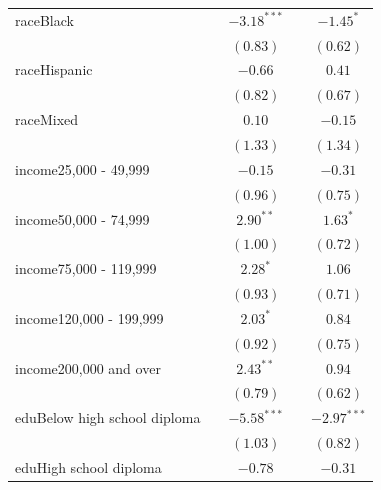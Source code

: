 \documentclass[
  12,
  letterpaper,
  DIV=11,
  numbers=noendperiod]{scrartcl}
\begin{document}
\begin{table}
{\begin{center}
\begin{tabular}{l c c c c}
raceBlack                       &               & $-3.18^{***}$ &              & $-1.45^{*}$   \\
                                &               & $(0.83)$      &              & $(0.62)$      \\
raceHispanic                    &               & $-0.66$       &              & $0.41$        \\
                                &               & $(0.82)$      &              & $(0.67)$      \\
raceMixed                       &               & $0.10$        &              & $-0.15$       \\
                                &               & $(1.33)$      &              & $(1.34)$      \\
income25,000 - 49,999           &               & $-0.15$       &              & $-0.31$       \\
                                &               & $(0.96)$      &              & $(0.75)$      \\
income50,000 - 74,999           &               & $2.90^{**}$   &              & $1.63^{*}$    \\
                                &               & $(1.00)$      &              & $(0.72)$      \\
income75,000 - 119,999          &               & $2.28^{*}$    &              & $1.06$        \\
                                &               & $(0.93)$      &              & $(0.71)$      \\
income120,000 - 199,999         &               & $2.03^{*}$    &              & $0.84$        \\
                                &               & $(0.92)$      &              & $(0.75)$      \\
income200,000 and over          &               & $2.43^{**}$   &              & $0.94$        \\
                                &               & $(0.79)$      &              & $(0.62)$      \\
eduBelow high school diploma    &               & $-5.58^{***}$ &              & $-2.97^{***}$ \\
                                &               & $(1.03)$      &              & $(0.82)$      \\
eduHigh school diploma          &               & $-0.78$       &              & $-0.31$       \\

\end{tabular}
\end{center}}
\end{table}
\end{document}
